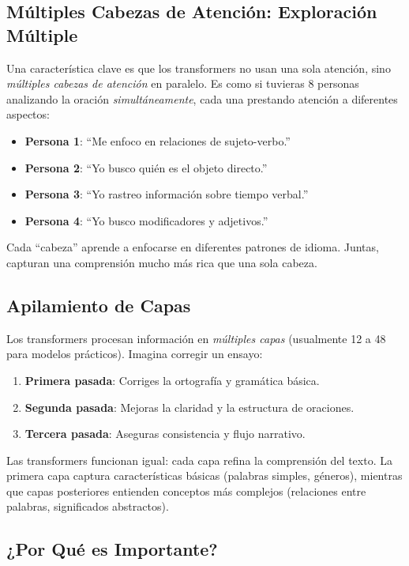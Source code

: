 \documentclass[11pt,a4paper]{article}
\begin{document}
\subsection{Múltiples Cabezas de Atención: Exploración Múltiple}

Una característica clave es que los transformers no usan una sola atención, sino \emph{múltiples cabezas de atención} en paralelo. Es como si tuvieras 8 personas analizando la oración \emph{simultáneamente}, cada una prestando atención a diferentes aspectos:

\begin{itemize}[leftmargin=*]
    \item \textbf{Persona 1}: ``Me enfoco en relaciones de sujeto-verbo.''
    \item \textbf{Persona 2}: ``Yo busco quién es el objeto directo.''
    \item \textbf{Persona 3}: ``Yo rastreo información sobre tiempo verbal.''
    \item \textbf{Persona 4}: ``Yo busco modificadores y adjetivos.''
\end{itemize}

Cada ``cabeza'' aprende a enfocarse en diferentes patrones de idioma. Juntas, capturan una comprensión mucho más rica que una sola cabeza.

\subsection{Apilamiento de Capas}

Los transformers procesan información en \emph{múltiples capas} (usualmente 12 a 48 para modelos prácticos). Imagina corregir un ensayo:
\begin{enumerate}[leftmargin=*]
    \item \textbf{Primera pasada}: Corriges la ortografía y gramática básica.
    \item \textbf{Segunda pasada}: Mejoras la claridad y la estructura de oraciones.
    \item \textbf{Tercera pasada}: Aseguras consistencia y flujo narrativo.
\end{enumerate}

Las transformers funcionan igual: cada capa refina la comprensión del texto. La primera capa captura características básicas (palabras simples, géneros), mientras que capas posteriores entienden conceptos más complejos (relaciones entre palabras, significados abstractos).

\subsection{¿Por Qué es Importante?}
\end{document}
